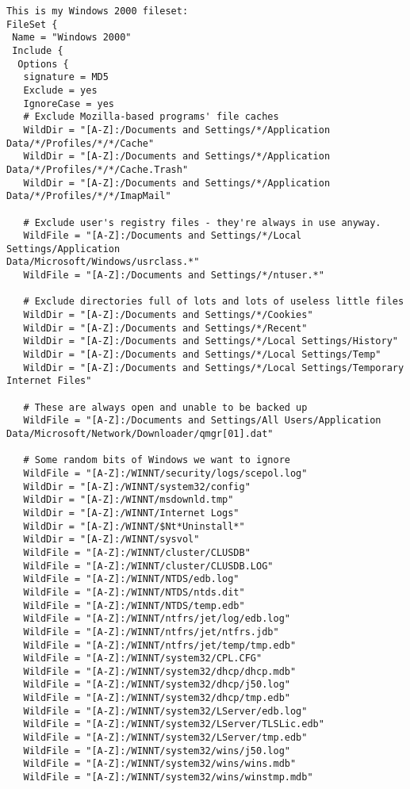 \footnotesize
\begin{verbatim}
This is my Windows 2000 fileset:
FileSet {
 Name = "Windows 2000"
 Include {
  Options {
   signature = MD5
   Exclude = yes
   IgnoreCase = yes
   # Exclude Mozilla-based programs' file caches
   WildDir = "[A-Z]:/Documents and Settings/*/Application
Data/*/Profiles/*/*/Cache"
   WildDir = "[A-Z]:/Documents and Settings/*/Application
Data/*/Profiles/*/*/Cache.Trash"
   WildDir = "[A-Z]:/Documents and Settings/*/Application
Data/*/Profiles/*/*/ImapMail"

   # Exclude user's registry files - they're always in use anyway.
   WildFile = "[A-Z]:/Documents and Settings/*/Local Settings/Application
Data/Microsoft/Windows/usrclass.*"
   WildFile = "[A-Z]:/Documents and Settings/*/ntuser.*"

   # Exclude directories full of lots and lots of useless little files
   WildDir = "[A-Z]:/Documents and Settings/*/Cookies"
   WildDir = "[A-Z]:/Documents and Settings/*/Recent"
   WildDir = "[A-Z]:/Documents and Settings/*/Local Settings/History"
   WildDir = "[A-Z]:/Documents and Settings/*/Local Settings/Temp"
   WildDir = "[A-Z]:/Documents and Settings/*/Local Settings/Temporary
Internet Files"

   # These are always open and unable to be backed up
   WildFile = "[A-Z]:/Documents and Settings/All Users/Application
Data/Microsoft/Network/Downloader/qmgr[01].dat"

   # Some random bits of Windows we want to ignore
   WildFile = "[A-Z]:/WINNT/security/logs/scepol.log"
   WildDir = "[A-Z]:/WINNT/system32/config"
   WildDir = "[A-Z]:/WINNT/msdownld.tmp"
   WildDir = "[A-Z]:/WINNT/Internet Logs"
   WildDir = "[A-Z]:/WINNT/$Nt*Uninstall*"
   WildDir = "[A-Z]:/WINNT/sysvol"
   WildFile = "[A-Z]:/WINNT/cluster/CLUSDB"
   WildFile = "[A-Z]:/WINNT/cluster/CLUSDB.LOG"
   WildFile = "[A-Z]:/WINNT/NTDS/edb.log"
   WildFile = "[A-Z]:/WINNT/NTDS/ntds.dit"
   WildFile = "[A-Z]:/WINNT/NTDS/temp.edb"
   WildFile = "[A-Z]:/WINNT/ntfrs/jet/log/edb.log"
   WildFile = "[A-Z]:/WINNT/ntfrs/jet/ntfrs.jdb"
   WildFile = "[A-Z]:/WINNT/ntfrs/jet/temp/tmp.edb"
   WildFile = "[A-Z]:/WINNT/system32/CPL.CFG"
   WildFile = "[A-Z]:/WINNT/system32/dhcp/dhcp.mdb"
   WildFile = "[A-Z]:/WINNT/system32/dhcp/j50.log"
   WildFile = "[A-Z]:/WINNT/system32/dhcp/tmp.edb"
   WildFile = "[A-Z]:/WINNT/system32/LServer/edb.log"
   WildFile = "[A-Z]:/WINNT/system32/LServer/TLSLic.edb"
   WildFile = "[A-Z]:/WINNT/system32/LServer/tmp.edb"
   WildFile = "[A-Z]:/WINNT/system32/wins/j50.log"
   WildFile = "[A-Z]:/WINNT/system32/wins/wins.mdb"
   WildFile = "[A-Z]:/WINNT/system32/wins/winstmp.mdb"


\end{verbatim}
